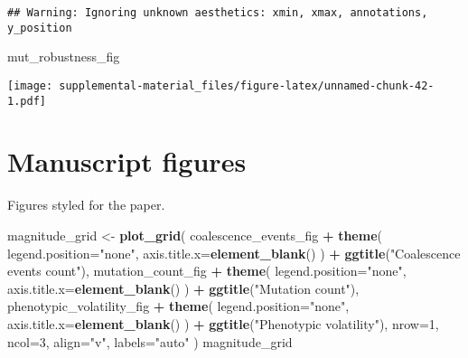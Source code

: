 \documentclass[]{book}
\newenvironment{Shaded}{\begin{snugshade}}{\end{snugshade}}
\newcommand{\DataTypeTok}[1]{\textcolor[rgb]{0.13,0.29,0.53}{#1}}
\newcommand{\DecValTok}[1]{\textcolor[rgb]{0.00,0.00,0.81}{#1}}
\newcommand{\KeywordTok}[1]{\textcolor[rgb]{0.13,0.29,0.53}{\textbf{#1}}}
\newcommand{\NormalTok}[1]{#1}
\newcommand{\OperatorTok}[1]{\textcolor[rgb]{0.81,0.36,0.00}{\textbf{#1}}}
\newcommand{\StringTok}[1]{\textcolor[rgb]{0.31,0.60,0.02}{#1}}
\begin{document}
\begin{verbatim}
## Warning: Ignoring unknown aesthetics: xmin, xmax, annotations, y_position
\end{verbatim}

\begin{Shaded}
\begin{Highlighting}[]
\NormalTok{mut_robustness_fig}
\end{Highlighting}
\end{Shaded}

\texttt{[image: supplemental-material\_files/figure-latex/unnamed-chunk-42-1.pdf]}

\hypertarget{manuscript-figures}{%
\section{Manuscript figures}\label{manuscript-figures}}

Figures styled for the paper.

\begin{Shaded}
\begin{Highlighting}[]
\NormalTok{magnitude_grid <-}\StringTok{ }\KeywordTok{plot_grid}\NormalTok{(}
\NormalTok{  coalescence_events_fig }\OperatorTok{+}
\StringTok{    }\KeywordTok{theme}\NormalTok{(}
      \DataTypeTok{legend.position=}\StringTok{"none"}\NormalTok{,}
      \DataTypeTok{axis.title.x=}\KeywordTok{element_blank}\NormalTok{()}
\NormalTok{    ) }\OperatorTok{+}
\StringTok{    }\KeywordTok{ggtitle}\NormalTok{(}\StringTok{"Coalescence events count"}\NormalTok{),}
\NormalTok{  mutation_count_fig }\OperatorTok{+}
\StringTok{    }\KeywordTok{theme}\NormalTok{(}
      \DataTypeTok{legend.position=}\StringTok{"none"}\NormalTok{,}
      \DataTypeTok{axis.title.x=}\KeywordTok{element_blank}\NormalTok{()}
\NormalTok{    ) }\OperatorTok{+}
\StringTok{    }\KeywordTok{ggtitle}\NormalTok{(}\StringTok{"Mutation count"}\NormalTok{),}
\NormalTok{  phenotypic_volatility_fig }\OperatorTok{+}
\StringTok{    }\KeywordTok{theme}\NormalTok{(}
      \DataTypeTok{legend.position=}\StringTok{"none"}\NormalTok{,}
      \DataTypeTok{axis.title.x=}\KeywordTok{element_blank}\NormalTok{()}
\NormalTok{    ) }\OperatorTok{+}
\StringTok{    }\KeywordTok{ggtitle}\NormalTok{(}\StringTok{"Phenotypic volatility"}\NormalTok{),}
  \DataTypeTok{nrow=}\DecValTok{1}\NormalTok{,}
  \DataTypeTok{ncol=}\DecValTok{3}\NormalTok{,}
  \DataTypeTok{align=}\StringTok{"v"}\NormalTok{,}
  \DataTypeTok{labels=}\StringTok{"auto"}
\NormalTok{)}
\NormalTok{magnitude_grid}
\end{Highlighting}
\end{Shaded}
\end{document}
